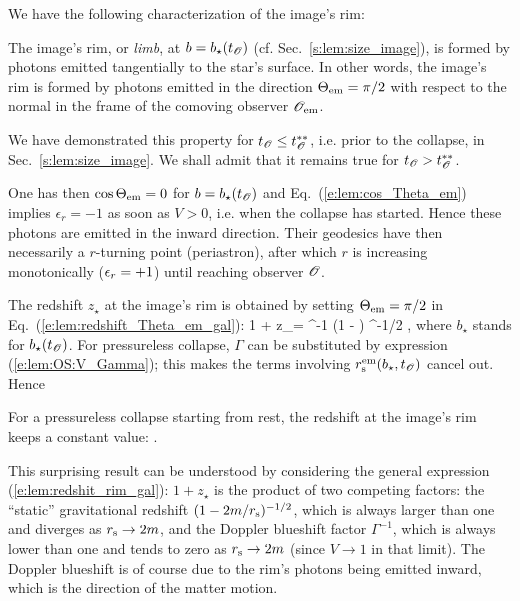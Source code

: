 We have the following characterization of the image's rim:
\begin{greybox}
The image's rim, or \emph{limb}, at $b=b_\star(t_{\mathscr{O}})$ (cf. Sec.~\ref{s:lem:size_image}),
is formed by photons emitted tangentially to the
star's surface. In other words, the image's rim is formed by photons
emitted in the direction $\Theta_{\rm em} = \pi/2$ with respect to the normal
in the frame of the comoving observer $\mathscr{O}_{\rm em}$.
\end{greybox}
We have demonstrated this property for $t_{\mathscr{O}} \leq t_{\mathscr{O}}^{**}$, i.e. prior to the collapse,
in Sec.~\ref{s:lem:size_image}. We shall admit that it remains true for
$t_{\mathscr{O}} > t_{\mathscr{O}}^{**}$.

One has then $\cos\Theta_{\rm em} = 0$ for $b=b_\star(t_{\mathscr{O}})$
and Eq.~(\ref{e:lem:cos_Theta_em}) implies $\epsilon_r = -1$ as soon as $V>0$, i.e. when
the collapse has started. Hence these photons are emitted in the inward direction.
Their geodesics have then necessarily a $r$-turning point (periastron), after which $r$
is increasing monotonically ($\epsilon_r = +1$) until reaching observer $\mathscr{O}$.

The redshift $z_\star$ at the image's rim is obtained by
setting $\Theta_{\rm em} = \pi/2$ in Eq.~(\ref{e:lem:redshift_Theta_em_gal}):
\be \label{e:lem:redshit_rim_gal}
    1 + z_\star = \Gamma^{-1}
    \left(1 - \right) ^{-1/2} ,
\ee
where $b_\star$ stands for $b_\star(t_{\mathscr{O}})$. For pressureless collapse,
$\Gamma$ can be substituted by expression (\ref{e:lem:OS:V_Gamma}); this
makes the terms involving $r_{\rm s}^{\rm em}(b_\star, t_{\mathscr{O}})$ cancel out.
Hence
\begin{greybox}
For a pressureless collapse starting from rest,
the redshift at the image's rim keeps a constant value:
\be \label{e:lem:redhsit_rim_pless}
    .
\ee
\end{greybox}
This surprising result can be understood by considering the general
expression (\ref{e:lem:redshit_rim_gal}): $1 + z_\star$ is the product
of two competing factors: the ``static'' gravitational redshift
$(1 - 2m/r_{\rm s})^{-1/2}$, which is always larger than one and diverges
as $r_{\rm s}\to 2m$, and the Doppler blueshift factor $\Gamma^{-1}$, which
is always lower than one and tends to zero as $r_{\rm s}\to 2m$ (since $V\to 1$
in that limit). The Doppler blueshift is of course due to the rim's photons being
emitted inward, which is the direction of the matter motion.

